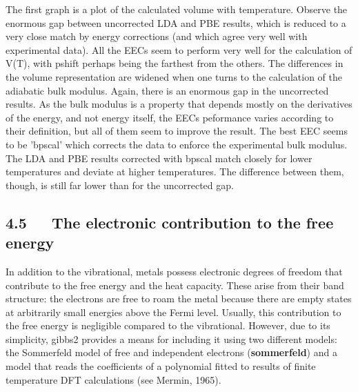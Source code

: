 \documentclass[a4paper]{article}
\begin{document}
\noindent{}

The first graph is a plot of the calculated volume with
temperature. Observe the enormous gap between uncorrected LDA and PBE
results, which is reduced to a very close match by energy
corrections (and which agree very well with experimental data). All
the EECs seem to perform very well for the calculation of V(T), with
pshift perhaps being the farthest from the others. The differences in
the volume representation are widened when one turns to the
calculation of the adiabatic bulk modulus. Again, there is an enormous
gap in the uncorrected results. As the bulk modulus is a property that
depends mostly on the derivatives of the energy, and not energy
itself, the EECs peformance varies according to their definition, but
all of them seem to improve the result. The best EEC seems to be
'bpscal' which corrects the data to enforce the experimental bulk
modulus. The LDA and PBE results corrected with bpscal match closely
for lower temperatures and deviate at higher temperatures. The
difference between them, though, is still far lower than for the
uncorrected gap.


\subsection{4.5   The electronic contribution to the free energy%
  \label{the-electronic-contribution-to-the-free-energy}%
}

In addition to the vibrational, metals possess electronic degrees of
freedom that contribute to the free energy and the heat
capacity. These arise from their band structure: the electrons are
free to roam the metal because there are empty states at arbitrarily
small energies above the Fermi level. Usually, this contribution to
the free energy is negligible compared to the vibrational. However,
due to its simplicity, gibbs2 provides a means for including it using
two different models: the Sommerfeld model of free and independent
electrons (\textbf{sommerfeld}) and a model that reads the coefficients of
a polynomial fitted to results of finite temperature DFT calculations
(see Mermin, 1965).
\end{document}
